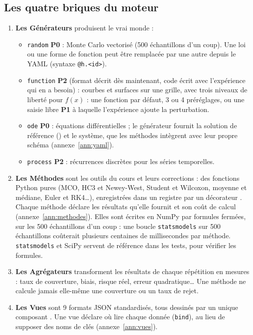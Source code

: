 \documentclass[11pt,a4paper]{article}
\newcommand{\pzero}{\colorbox{ctCorrection!18}{\footnotesize\textbf{P0}}}
\newcommand{\pone}{\colorbox{ctMethod!18}{\footnotesize\textbf{P1}}}
\newcommand{\ptwo}{\colorbox{ctBaseline!18}{\footnotesize\textbf{P2}}}
\begin{document}
\subsection{Les quatre briques du moteur}
\begin{enumerate}[leftmargin=*]
  \item \textbf{Les Générateurs} produisent le \og vrai monde \fg{} :
  \begin{itemize}[nosep]
    \item \texttt{random} \pzero{} : Monte Carlo vectorisé (500 échantillons d'un coup). Une loi ou une forme de fonction peut être remplacée par une autre depuis le YAML (syntaxe \texttt{@h.<id>}).
    \item \texttt{function} \ptwo{} (format décrit dès maintenant, code écrit avec l'expérience qui en a besoin) : courbes et surfaces sur une grille, avec trois niveaux de liberté pour $f(x)$ : une fonction par défaut, 3 ou 4 préréglages, ou une saisie libre \pone{} à laquelle l'expérience ajoute la perturbation.
    \item \texttt{ode} \pzero{} : équations différentielles ; le générateur fournit la solution de référence () et le système, que les méthodes intègrent avec leur propre schéma (annexe~\ref{ann:yaml}).
    \item \texttt{process} \ptwo{} : récurrences discrètes pour les séries temporelles.
  \end{itemize}
  \item \textbf{Les Méthodes} sont les outils du cours et leurs corrections : des fonctions Python pures (MCO, HC3 et Newey-West, Student et Wilcoxon, moyenne et médiane, Euler et RK4\dots), enregistrées dans un registre par un décorateur . Chaque méthode déclare les résultats qu'elle fournit et son coût de calcul (annexe~\ref{ann:methodes}). Elles sont écrites en NumPy par formules fermées, sur les 500 échantillons d'un coup : une boucle \texttt{statsmodels} sur 500 échantillons coûterait plusieurs centaines de millisecondes par méthode. \texttt{statsmodels} et SciPy servent de référence dans les tests, pour vérifier les formules.
  \item \textbf{Les Agrégateurs} transforment les résultats de chaque répétition en mesures : taux de couverture, biais, risque réel, erreur quadratique\dots{} Une méthode ne calcule jamais elle-même une couverture ou un taux de rejet.
  \item \textbf{Les Vues} sont 9 formats JSON standardisés, tous dessinés par un unique composant . Une vue déclare où lire chaque donnée (\texttt{bind}), au lieu de supposer des noms de clés (annexe~\ref{ann:vues}).
\end{enumerate}
\end{document}
